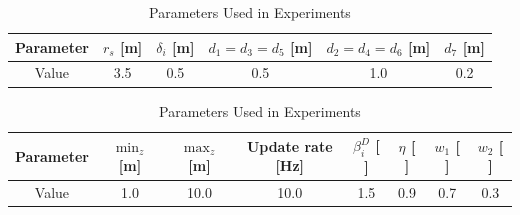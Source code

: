 

        \begin{table}[H]
            \centering
            \caption{Parameters Used in Experiments}
            \begin{tabular}{|c|c|c|c|c|c|}
                \hline
                Parameter & $r_s$ [m] & $\delta_i$ [m] & $d_1 = d_3 = d_5$ [m] & $d_2 = d_4 = d_6$ [m] & $d_7$ [m] \\ \hline
                Value     & 3.5       & 0.5            & 0.5                   & 1.0                   & 0.2       \\ \hline
            \end{tabular}
        
            \vspace{0.3cm}
        
            \begin{tabular}{|c|c|c|c|c|c|c|c|}
                \hline
                Parameter & $\min_z$ [m] & $\max_z$ [m] & Update rate [Hz] & $\beta_i^D$ [ ] & $\eta$ [ ] & $w_1$ [ ] & $w_2$ [ ] \\ \hline
                Value     & 1.0          & 10.0         & 10.0             & 1.5             & 0.9        & 0.7       & 0.3       \\ \hline
            \end{tabular}
            \label{tab:experiment_parameters_combined}
        \end{table}

